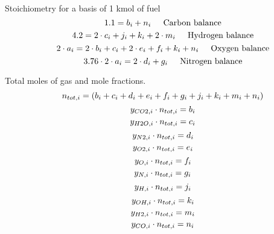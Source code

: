 \documentclass[10pt,fleqn]{article}
\newcommand{\I}{\mbox{\hspace{0.20in}}}
\begin{document}
\vspace{0.04in}
\noindent
\rm Stoichiometry for a basis of 1 kmol of fuel
\begin{equation}
\I \label{EES Eqn:22}
1.1 = b_{i} + n_{i}	 
\mbox{\I Carbon balance}
\end{equation}
\begin{equation}
\I \label{EES Eqn:23}
4.2 =  2 \cdot  c_{i} + j_{i} + k_{i} + 2 \cdot  m_{i}	 
\mbox{\I Hydrogen balance}
\end{equation}
\begin{equation}
\I \label{EES Eqn:24}
2 \cdot  a_{i} = 2 \cdot  b_{i} + c_{i} + 2 \cdot  e_{i} + f_{i} + k_{i} + n_{i}	 
\mbox{\I Oxygen balance}
\end{equation}
\begin{equation}
\I \label{EES Eqn:25}
3.76 \cdot  2 \cdot  a_{i} = 2 \cdot  d_{i} + g_{i}	 
\mbox{\I Nitrogen balance}
\end{equation}

\vspace{0.04in}
\noindent
\rm Total moles of gas and mole fractions.
\begin{equation}
\I \label{EES Eqn:26}
n_{tot,i} =  \left( b_{i} +c_{i} +d_{i} +e_{i} +f_{i} +g_{i} + j_{i} + k_{i} + m_{i} + n_{i} \right)  
\end{equation}
\begin{equation}
\I \label{EES Eqn:27}
y_{CO2,i} \cdot  n_{tot,i} = b_{i} 
\end{equation}
\begin{equation}
\I \label{EES Eqn:28}
y_{H2O,i} \cdot  n_{tot,i} = c_{i} 
\end{equation}
\begin{equation}
\I \label{EES Eqn:29}
y_{N2,i} \cdot  n_{tot,i} = d_{i} 
\end{equation}
\begin{equation}
\I \label{EES Eqn:30}
y_{O2,i} \cdot  n_{tot,i} = e_{i} 
\end{equation}
\begin{equation}
\I \label{EES Eqn:31}
y_{O,i} \cdot  n_{tot,i} = f_{i} 
\end{equation}
\begin{equation}
\I \label{EES Eqn:32}
y_{N,i} \cdot  n_{tot,i} = g_{i} 
\end{equation}
\begin{equation}
\I \label{EES Eqn:33}
y_{H,i} \cdot  n_{tot,i} = j_{i} 
\end{equation}
\begin{equation}
\I \label{EES Eqn:34}
y_{OH,i} \cdot  n_{tot,i} = k_{i} 
\end{equation}
\begin{equation}
\I \label{EES Eqn:35}
y_{H2,i} \cdot  n_{tot,i} = m_{i} 
\end{equation}
\begin{equation}
\I \label{EES Eqn:36}
y_{CO,i} \cdot  n_{tot,i} = n_{i} 
\end{equation}
\end{document}
